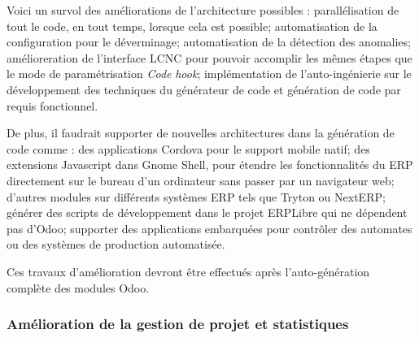 Voici un survol des améliorations de l'architecture possibles : parallélisation de tout le code, en tout temps, lorsque cela est possible; automatisation de la configuration pour le déverminage; automatisation de la détection des anomalies; amélioreration de l’interface LCNC pour pouvoir accomplir les mêmes étapes que le mode de paramétrisation \textit{Code} \textit{hook}; implémentation de l'auto-ingénierie sur le développement des techniques du générateur de code et génération de code par requis fonctionnel.

De plus, il faudrait supporter de nouvelles architectures dans la génération de code comme : des applications Cordova pour le support mobile natif;  des extensions Javascript dans Gnome Shell, pour étendre les fonctionnalités du ERP directement sur le bureau d’un ordinateur sans passer par un navigateur web; d'autres modules sur différents systèmes ERP tels que Tryton ou NextERP; générer des scripts de développement dans le projet ERPLibre qui ne dépendent pas d’Odoo; supporter des applications embarquées pour contrôler des automates ou des systèmes de production automatisée.






Ces travaux d’amélioration devront être effectués après l’auto-génération complète des modules Odoo.

\subsubsection{Amélioration de la gestion de projet et statistiques}

